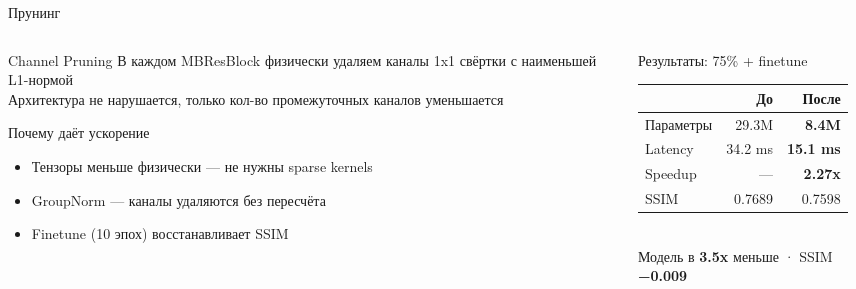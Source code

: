 \documentclass[aspectratio=169,11pt]{beamer}
\begin{document}
\begin{frame}[shrink=10]{Прунинг}
  \begin{columns}[T]
    \begin{column}{0.50\textwidth}
      \begin{block}{Channel Pruning}
        В каждом MBResBlock физически удаляем каналы 1x1 свёртки с наименьшей L1-нормой\\[0.2em]
        Архитектура не нарушается, только кол-во промежуточных каналов уменьшается
      \end{block}
      \vspace{0.2em}
      \begin{exampleblock}{Почему даёт ускорение}
        \begin{itemize}
          \item Тензоры меньше физически — не нужны sparse kernels
          \item GroupNorm — каналы удаляются без пересчёта
          \item Finetune (10 эпох) восстанавливает SSIM
        \end{itemize}
      \end{exampleblock}
    \end{column}
    \begin{column}{0.46\textwidth}
      \begin{alertblock}{Результаты: 75\% + finetune}
        \footnotesize\renewcommand{\arraystretch}{1.1}
        \begin{tabular}{@{}lrr@{}}
          \toprule
          & До & После \\
          \midrule
          Параметры & 29.3M & \textbf{8.4M} \\
          Latency & 34.2 ms & \textbf{15.1 ms} \\
          Speedup & — & \textbf{2.27x} \\
          SSIM & 0.7689 & 0.7598 \\
          \bottomrule
        \end{tabular}\\[0.15em]
        Модель в \textbf{3.5x} меньше · SSIM \textbf{−0.009}
      \end{alertblock}
    \end{column}
  \end{columns}
\end{frame}
\end{document}
